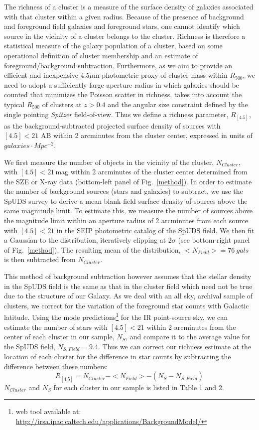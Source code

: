 \documentclass[apj,twocolumn]{emulateapj}
\begin{document}
{The richness of a cluster is a measure of the surface density of galaxies associated with that cluster within a given radius. Because of the presence of background and foreground field galaxies and foreground stars, one cannot identify which source in the vicinity of a cluster belongs to the cluster. Richness is therefore a statistical measure of the galaxy population of a cluster, based on some operational definition of cluster membership and an estimate of foreground/background subtraction. 
Furthermore, as we aim to provide an efficient and inexpensive 4.5$\mu$m photometric proxy of cluster mass within $R_{500}$, we need to adopt a sufficiently large aperture radius in which galaxies should be counted that minimizes the Poisson scatter in richness, takes into account the typical $R_{500}$ of clusters at $z>0.4$ and the angular size
constraint defined by the single pointing {\it Spitzer} field-of-view. Thus we define a richness parameter, $R_{[4.5]}$, as the background-subtracted projected surface density of sources with $[4.5]<21$ AB  within 2 arcminutes from the cluster center, expressed in units of $galaxies \cdot Mpc^{-2}$. 

We first measure the number of objects in the vicinity of the cluster, $N_{Cluster}$, with $[4.5]<21$\,mag  within 2 arcminutes of the cluster center determined from the SZE or X-ray data (bottom-left panel of Fig.~\ref{method}). In order to estimate the number of background sources (stars and galaxies) to subtract, we use the SpUDS survey to derive a mean blank field surface density of sources
above the same magnitude limit. 
To estimate this, we measure the number of sources above the magnitude limit within an aperture radius of 2 arcminutes from each source with $[4.5]<21$ in the SEIP photometric catalog of the  SpUDS field.  We then fit a Gaussian to the distribution, iteratively clipping at 2$\sigma$ (see bottom-right panel of Fig.~\ref{method}). The resulting mean of the distribution, $<N_{Field}>=76~gals$ is then subtracted from $N_{Cluster}$. 

This method of background subtraction however assumes that the stellar density in the SpUDS field is the same as that in the cluster field which need not be true due to the structure of our Galaxy.
As we deal with an all sky, archival sample of clusters, we correct for the variation of the foreground star counts with Galactic latitude.  Using the \citet{Wainscoat92} mode predictions\footnote{web tool available at: \url{http://irsa.ipac.caltech.edu/applications/BackgroundModel/}}  for the IR point-source sky, we can estimate the number of stars with $[4.5]<21$  within 2 arcminutes from the center of each cluster in our sample, $N_{S}$, and compare it to the average value for the SpUDS field, $N_{S, Field}=9.4$. Thus we can correct our richness estimate at the location of each cluster for the difference in star counts by subtracting the difference between these numbers:
\begin{equation}
R_{[4.5]}= N_{Cluster} - <N_{Field}> - (N_{S} - N_{S, Field}) 
\label{rich corr}
\end{equation}
$N_{Cluster}$ and $N_{S}$ for each cluster in our sample is listed in Table 1 and 2.

}
\end{document}
